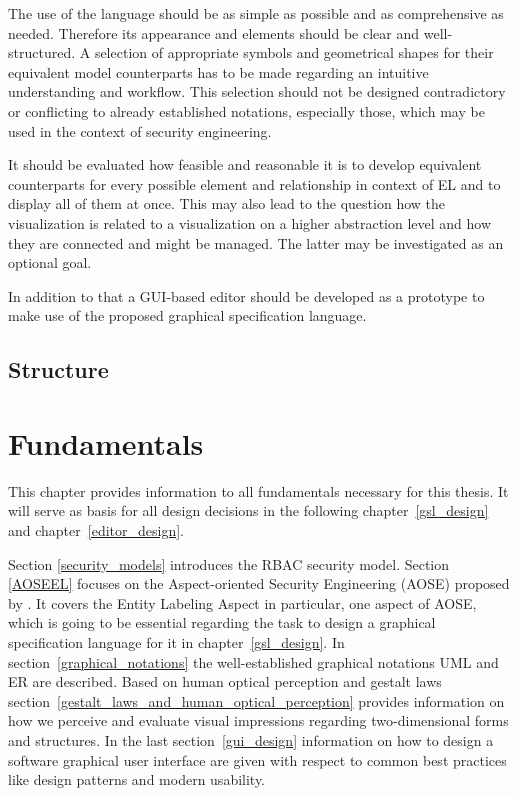 \documentclass[twoside, openright, 12pt]{book}
\begin{document}
The use of the language should be as simple as possible and as comprehensive as needed.
Therefore its appearance and elements should be clear and well-structured.
A selection of appropriate symbols and geometrical shapes for their equivalent model counterparts has to be made regarding an intuitive understanding and workflow.
This selection should not be designed contradictory or conflicting to already established notations, especially those, which may be used in the context of security engineering.

It should be evaluated how feasible and reasonable it is to develop equivalent counterparts for every possible element and relationship in context of EL and to display all of them at once.
This may also lead to the question how the visualization is related to a visualization on a higher abstraction level and how they are connected and might be managed.
The latter may be investigated as an optional goal.

In addition to that a GUI-based editor should be developed as a prototype to make use of the proposed graphical specification language.



\section{Structure}
\label{structure}




\cleardoublepage
\chapter{Fundamentals}
\label{fundamentals}
This chapter provides information to all fundamentals necessary for this thesis.
It will serve as basis for all design decisions in the following chapter~\ref{gsl_design} and chapter~\ref{editor_design}.

Section \ref{security_models} introduces the RBAC security model.
Section \ref{AOSEEL} focuses on the Aspect-oriented Security Engineering (AOSE) proposed by \citet*{Amthor18}.
It covers the Entity Labeling Aspect in particular, one aspect of AOSE, which is going to be essential regarding the task to design a graphical specification language for it in chapter~\ref{gsl_design}.
In section~\ref{graphical_notations} the well-established graphical notations UML and ER are described.
Based on human optical perception and gestalt laws section~\ref{gestalt_laws_and_human_optical_perception} provides information on how we perceive and evaluate visual impressions regarding two-dimensional forms and structures.
In the last section~\ref{gui_design} information on how to design a software graphical user interface are given with respect to common best practices like design patterns and modern usability.
\end{document}
